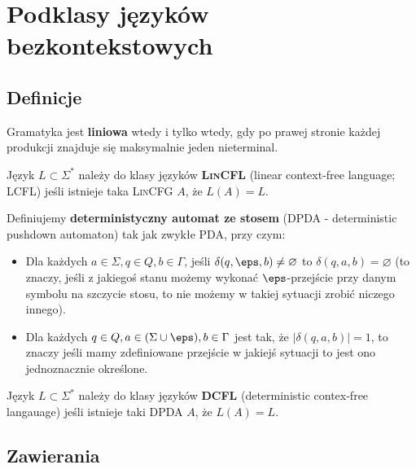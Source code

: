 \section{Podklasy języków bezkontekstowych}
\label{cfl-subclassses}

\subsection{Definicje}

\begin{definition}  
    Gramatyka jest \textbf{liniowa} wtedy i tylko wtedy, gdy po prawej stronie każdej produkcji znajduje się maksymalnie jeden nieterminal.
\end{definition}

\begin{definition}
    Język \(L \subset \Sigma^*\) należy do klasy języków \textbf{\textsc{LinCFL}} (linear context-free language; LCFL) jeśli istnieje taka \textsc{LinCFG} \(A\), że \(L(A) = L\).
\end{definition}

\begin{definition}
    Definiujemy \textbf{deterministyczny automat ze stosem} (DPDA - deterministic pushdown automaton) tak jak zwykłe PDA, przy czym:
    
    \begin{itemize}
        \item Dla każdych \( a \in \Sigma, q \in Q, b \in \Gamma \), jeśli \( \delta(q, \eps, b) \not = \varnothing \) to \( \delta(q, a, b) = \varnothing \) (to znaczy, jeśli z jakiegoś stanu możemy wykonać \(\eps\)-przejście przy danym symbolu na szczycie stosu, to nie możemy w takiej sytuacji zrobić niczego innego).
        \item Dla każdych \( q \in Q, a \in (\Sigma \cup \eps) , b \in \Gamma \) jest tak, że \( |\delta(q, a, b)| = 1\), to znaczy jeśli mamy zdefiniowane przejście w jakiejś sytuacji to jest ono jednoznacznie określone. 
    \end{itemize}
\end{definition}

\begin{definition}
    Język \(L \subset \Sigma^*\) należy do klasy języków \textbf{DCFL} (deterministic contex-free langauage) jeśli istnieje taki DPDA \(A\), że \(L(A) = L\).
\end{definition}

\subsection{Zawierania}

